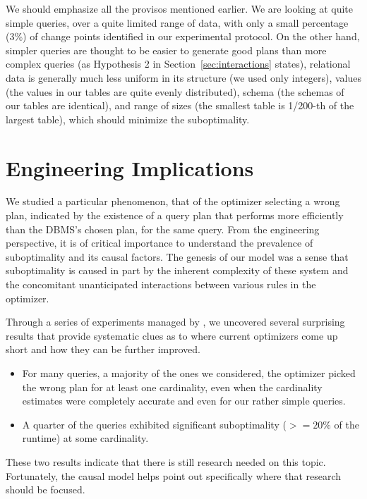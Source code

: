 \documentclass[prodmode,acmtods]{acmsmall}
\def\azdb{\doubleblind{\hbox{\sc AZDBLab}}{\hbox{\sc DBLab}}}
\begin{document}
We should emphasize all the provisos mentioned earlier. We are looking at
quite simple queries, over a quite limited range of data, with only a small
percentage (3\%) of change points identified in our experimental
protocol. On the other hand, simpler queries are thought to be easier to
generate good plans than more complex queries (as Hypothesis 2 in
Section~\ref{sec:interactions} states), relational data is generally much less uniform
in its structure (we used only integers), values (the values in our
tables are quite evenly distributed), schema (the schemas of our tables
are identical), and range of sizes (the smallest table is 1/200-th of the
largest table), which should minimize the suboptimality.

\section{Engineering Implications}\label{sec:engineering}
We studied a particular
phenomenon, that of the \hbox{optimizer} selecting a wrong plan, indicated by the existence of a query plan that performs more efficiently
than the DBMS's chosen plan, for the same query. From the engineering
\hbox{perspective}, it is of critical importance to understand the prevalence
of suboptimality and its causal factors. The genesis of our model was a sense that suboptimality
is caused in part by the inherent complexity of these system and the
concomitant unanticipated interactions between various rules in the
optimizer.


Through a series of experiments managed by \azdb, we uncovered
several surprising results that provide systematic clues as to where current optimizers come up
short and how they can be further improved.

\begin{itemize}
\item For many queries, a majority of the ones we
considered, the optimizer picked the wrong plan for at least one
cardinality, even when the cardinality estimates were completely accurate
and even for our rather simple queries.

\item A quarter of the queries exhibited significant suboptimality ($>= 20\%$ of
        the runtime) at some cardinality.
\end{itemize}
\noindent
These two results indicate that there is still research needed on
this topic. Fortunately, the causal model helps point out
specifically where that research should be focused.
\end{document}
